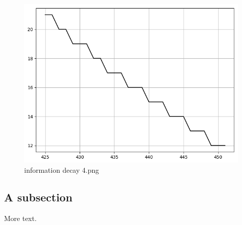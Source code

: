 \documentclass[11pt]{article} %
\begin{document}
\begin{figure}
  \includegraphics[width=\linewidth]{./images02/new-images/information_decay.png}
  \caption{information decay 4.png}
  \label{fig:boat1}
\end{figure}




\subsection{A subsection}

More text.
\end{document}
